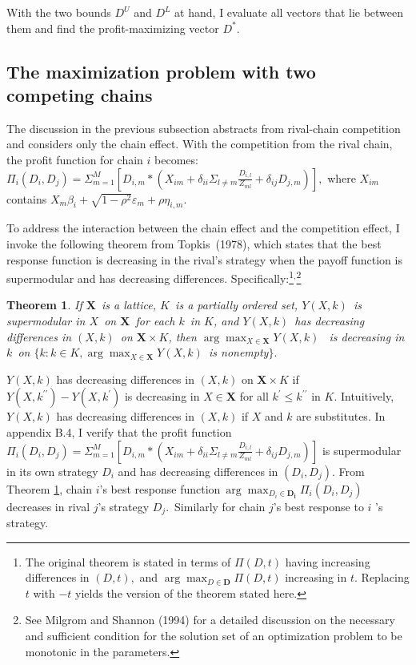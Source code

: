 \documentclass[notitlepage,onecolumn,11pt]{article}
\newtheorem{theorem}{Theorem}
\begin{document}
With the two bounds $D^{U}$ and $D^{L}$ at hand, I evaluate all vectors that
lie between them and find the profit-maximizing vector $D^{\ast }.$

\subsection{The maximization problem with two competing chains\label{Comp}}

The discussion in the previous subsection abstracts from rival-chain
competition and considers only the chain effect. With the competition from
the rival chain, the profit function for chain $i$ becomes: $\Pi
_{i}(D_{i},D_{j})=\Sigma _{m=1}^{M}[D_{i,m}\ast (X_{im}+\delta _{ii}\Sigma
_{l\neq m}\frac{D_{i,l}}{Z_{ml}}+\delta _{ij}D_{j,m})],$ where $X_{im}$
contains $X_{m}\beta _{i}+\sqrt{1-\rho ^{2}}\varepsilon _{m}+\rho \eta
_{i,m}.$

To address the interaction between the chain effect and the competition
effect, I invoke the following theorem from Topkis\ (1978), which states
that the best response function is decreasing in the rival's strategy when
the payoff function is supermodular and has decreasing differences.
Specifically:\footnote{%
The original theorem is stated in terms of $\Pi (D,t)$ having increasing
differences in $(D,t),$ and $\arg \max_{D\in \mathbf{D}}\Pi (D,t)$
increasing in $t.$ Replacing $t$ with $-t$ yields the version of the theorem
stated here.}$^{,}$\footnote{%
See Milgrom and Shannon (1994) for a detailed discussion on the necessary
and sufficient condition for the solution set of an optimization problem to
be monotonic in the parameters.}

\begin{theorem}
\label{Topkis} \textit{If $\mathbf{X}$\ is a lattice, }$K$\textit{\ is a
partially ordered set, }$Y(X,k)$\textit{\ is supermodular in }$X$\textit{\
on }$\mathbf{X}$\textit{\ for each }$k$\textit{\ in }$K$\textit{, and }$%
Y(X,k)$\textit{\ has decreasing differences in }$(X,k)$\textit{\ on }$%
\mathbf{X}\times K$\textit{, then }$\arg \max_{X\in \mathbf{X}}Y(X,k)$%
\textit{\ is decreasing in }$k$\textit{\ on }$\{k:k\in K,\arg \max_{X\in 
\mathbf{X}}Y(X,k)$\textit{\ is nonempty}$\}.$
\end{theorem}

$Y(X,k)$ has decreasing differences in $(X,k)$ on $\mathbf{X}\times K$ if $%
Y(X,k^{\prime \prime })-Y(X,k^{\prime })$ is decreasing in $X\in \mathbf{X}$
for all $k^{\prime }\leq k^{\prime \prime }$ in $K.$ Intuitively, $Y(X,k)$
has decreasing differences in $(X,k)$ if $X$ and $k$ are substitutes. In
appendix B.4, I verify that the profit function $\Pi
_{i}(D_{i},D_{j})=\Sigma _{m=1}^{M}[D_{i,m}\ast (X_{im}+\delta _{ii}\Sigma
_{l\neq m}\frac{D_{i,l}}{Z_{ml}}+\delta _{ij}D_{j,m})]$ is supermodular in
its own strategy $D_{i}$ and has decreasing differences in $(D_{i},D_{j}).$
From Theorem \ref{Topkis}, chain $i$'s best response function$~\arg
\max_{D_{i}\in \mathbf{D}_{\mathbf{i}}}\Pi _{i}(D_{i},D_{j})$ decreases in
rival $j$'s strategy $D_{j}$.\ Similarly for chain $j$'s best response to $i$%
's strategy.
\end{document}
